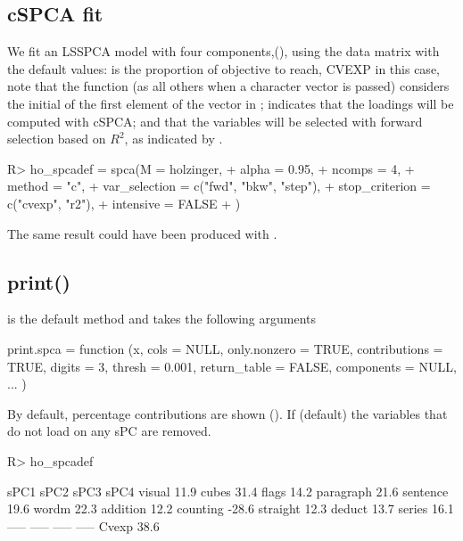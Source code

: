 \documentclass[article]{jss}
\newcommand{\fct}[1]{\code{#1()}}
\begin{document}
\subsection{cSPCA fit}
We fit an LSSPCA model with four components,(), using the data matrix  with the default values:  is the proportion of objective to reach, CVEXP in this case, note that the function (as all others when a character vector is passed) considers the initial of the first element of the vector in ;  indicates that the loadings will be computed with cSPCA; and  that the variables will be selected with forward selection based on $R^2$, as indicated by .
\begin{Schunk}
\begin{Sinput}
R> ho_spcadef = spca(M = holzinger,
+                    alpha = 0.95,
+                    ncomps = 4,
+                    method = "c",
+                    var_selection = c("fwd", "bkw", "step"),
+                    stop_criterion = c("cvexp", "r2"),
+                    intensive = FALSE
+                    )
\end{Sinput}
\end{Schunk}

The same result could have been produced with .

\subsection{print()}
\fct{print} is the default method and takes the following arguments
\begin{Code}
print.spca = function (x, cols = NULL, only.nonzero = TRUE, 
                contributions = TRUE, digits = 3, thresh = 0.001, 
                return_table = FALSE, components = NULL, ...
                ) 
\end{Code}

By default, percentage contributions are shown (). If  (default) the variables that do not load on any sPC are removed.
\begin{Schunk}
\begin{Sinput}
R> ho_spcadef
\end{Sinput}
\begin{Soutput}
            sPC1   sPC2   sPC3   sPC4
visual     11.9%
cubes                    31.4%
flags      14.2%
paragraph         21.6%
sentence   19.6%
wordm             22.3%
addition   12.2%
counting         -28.6%
straight   12.3%
deduct     13.7%
series     16.1%
           -----  -----  -----  -----
Cvexp      38.6%
\end{Soutput}
\end{Schunk}
\end{document}
